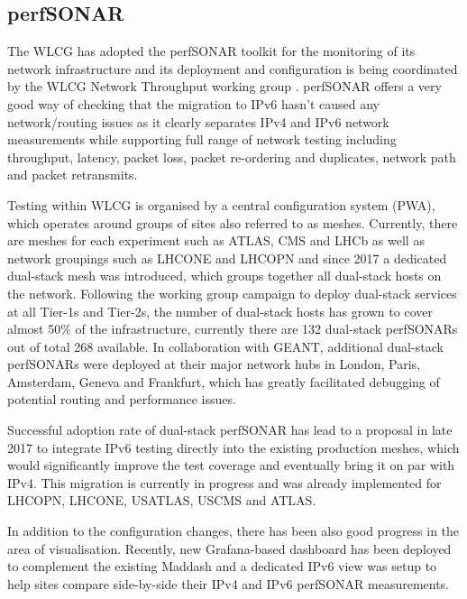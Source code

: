 \subsection{perfSONAR}
The WLCG has adopted the perfSONAR toolkit \cite{perfsonar} for the monitoring of its network infrastructure and its deployment and configuration is being coordinated by the WLCG Network Throughput working group \cite{wlcg-NTWG}.  perfSONAR offers a very good way of checking that the migration to IPv6 hasn't caused any network/routing issues as it clearly separates IPv4 and IPv6 network measurements while supporting full range of network testing including throughput, latency, packet loss, packet re-ordering and duplicates, network path and packet retransmits.

Testing within WLCG is organised by a central configuration system (PWA), which operates around groups of sites also referred to as meshes. Currently, there are meshes for each  experiment such as ATLAS, CMS and LHCb as well as network groupings such as LHCONE and LHCOPN and since 2017 a dedicated dual-stack mesh was introduced, which groups together all dual-stack hosts on the network. Following the working group campaign to deploy dual-stack services at all Tier-1s and Tier-2s, the number of dual-stack hosts has grown to cover almost 50\% of the infrastructure, currently there are 132 dual-stack perfSONARs out of total 268 available. In collaboration with GEANT, additional dual-stack perfSONARs were deployed at their major network hubs in London, Paris, Amsterdam, Geneva and Frankfurt, which has greatly facilitated debugging of potential routing and performance issues. 

Successful adoption rate of dual-stack perfSONAR has lead to a proposal in late 2017 to integrate IPv6 testing directly into the existing production meshes, which would significantly improve the test coverage and eventually bring it on par with IPv4. This migration is currently in progress and was already implemented for LHCOPN, LHCONE, USATLAS, USCMS and ATLAS. 

In addition to the configuration changes, there has been also good progress in the area of visualisation. Recently, new Grafana-based dashboard has been deployed to complement the existing Maddash \cite{psmad} and a dedicated IPv6 view was setup \cite{grafana-ipv6} to help sites compare side-by-side their IPv4 and IPv6 perfSONAR measurements. 

